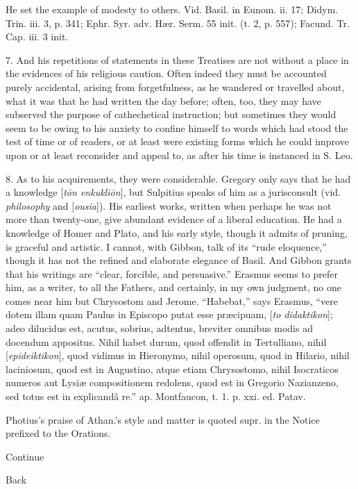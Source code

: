 He set the example of modesty to others. Vid.
Basil. in Eunom. ii. 17; Didym. Trin. iii. 3, p. 341; Ephr. Syr. adv.
Hær. Serm. 55 init. (t. 2, p. 557); Facund. Tr. Cap. iii. 3 init.

7. And his repetitions of statements in these
Treatises are not without a place in the evidences of his religious
caution. Often indeed they must be accounted purely accidental,
arising from forgetfulness, as he wandered or travelled about, what it
was that he had written the day before; often, too, they may have
subserved the purpose of cathechetical instruction; but sometimes they
would seem to be owing to his anxiety to confine himself to words
which had stood the test of time or of readers, or at least were
existing forms which he could improve upon or at least reconsider and
appeal to, as after his time is instanced in S. Leo.

8. As to his acquirements, they were
considerable. Gregory only says that he had a knowledge [\emph{t\={o}n
enkukli\={o}n}], but Sulpitius speaks of him as a jurisconsult (vid.
\emph{philosophy} and [\emph{ousia}]). His earliest works, written
when perhaps he was not more than twenty-one, give abundant evidence
of a liberal education. He had a knowledge of Homer and Plato, and his
early style, though it admits of pruning, is graceful and artistic. I
cannot, with Gibbon, talk of its ``rude eloquence,'' though it has not
the refined and elaborate elegance of Basil. And Gibbon grants that
his writings are ``clear, forcible, and persuasive.'' Erasmus seems to
prefer him, as a writer, to all the Fathers, and certainly, in my
own judgment, no one comes near him but Chrysostom and Jerome. ``Habebat,''
says Erasmus, ``vere dotem illam quam Paulus in Episcopo putat esse præcipuam,
[\emph{to didaktikon}]; adeo dilucidus est, acutus, sobrius, adtentus,
breviter omnibus modis ad docendum appositus. Nihil habet durum, quod
offendit in Tertulliano, nihil [\emph{epideiktikon}], quod vidimus in
Hieronymo, nihil operosum, quod in Hilario, nihil laciniosum, quod est
in Augustino, atque etiam Chrysostomo, nihil Isocraticos numeros aut
Lysiæ compositionem redolens, quod est in Gregorio Nazianzeno, sed
totus est in explicandâ re.'' ap. Montfaucon, t. 1. p. xxi. ed. Patav.

Photius's praise of Athan.'s style and matter is
quoted supr. in the Notice prefixed to the Orations.

Continue

Back


